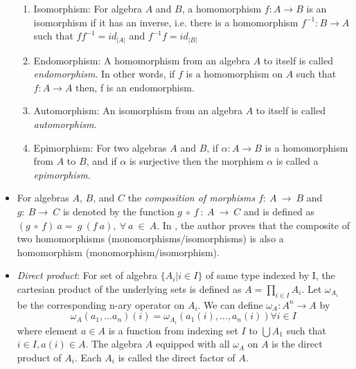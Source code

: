 \begin{itemize}
\begin{enumerate}
        \item Isomorphism: For algebra $A$ and $B$, a homomorphism $f:A → B$ is
        an isomorphism if it has an inverse, i.e. there is a homomorphism
        $f^{-1}:B → A$ such that $ff^{-1} =
        id_{|A|}$ and $f^{-1}f = id_{|B|}$ 

        \item Endomorphism: A homomorphism from an algebra $A$ to itself is
        called \textit{endomorphism}. In other words, if $f$ is a homomorphism on $A$
        such that $f:A\rightarrow A$ then, f is an endomorphism.

        \item Automorphism: An isomorphism from an algebra $A$ to itself is
        called \textit{automorphism}.

        \item Epimorphism: For two algebras $A$ and $B$, if \(\alpha : A
        \rightarrow B \) is a homomorphism from $A$ to $B$, and if \(\alpha\) is
        surjective then the morphism \(\alpha\) is called a
        \textit{epimorphism}.
    \end{enumerate}

    \item For algebras $A$, $B$, and $C$ the \textit{composition of morphisms}
    $f:\ A \ \rightarrow \ B$ and $g:\ B \rightarrow\ C$ is denoted by the
    function $g\ \circ \ f\ :\ A\ \rightarrow \ C$ and is defined as $(g\ \circ
    \ f)\ a = \ g\ (f\ a), \ \forall \ a\ \in\ A$. In
    \cite{sankappanavar1981course}, the author proves that the composite of two
    homomorphisms (monomorphisms/isomorphisms) is also a homomorphism
    (monomorphism/isomorphism).

    \item \textit{Direct product}: For set of algebra $\{ A_i | i \in I \}$ of
    same type indexed by I, the cartesian product of the underlying sets is
    defined as $A = \displaystyle \prod_{i\in I} A_i$. Let $\omega_{A_i}$ be the
    corresponding n-ary operator on $A_i$. We can define $\omega_A : A^{n}
    \rightarrow A$ by \[ \omega_A(a_1,...a_n)(i) = \omega_{A_i}
    (a_1(i),...,a_n(i)) \forall i \in I\] where element $a \in A$ is a function
    from indexing set $I$ to $\bigcup A_1$ such that $i \in I, a(i) \in A$. The
    algebra $A$ equipped with all $\omega_A$ on $A$ is the direct product of
    $A_i$. Each $A_i$ is called the direct factor of $A$.

\end{itemize}
